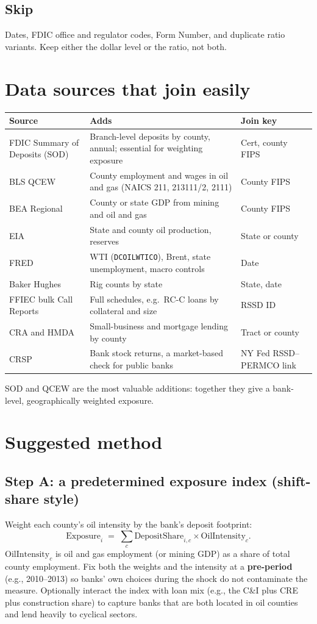 \documentclass[11pt]{article}
\begin{document}
\subsection*{Skip}
Dates, FDIC office and regulator codes, Form Number, and duplicate ratio variants. Keep either the dollar level or the ratio, not both.

\section{Data sources that join easily}

\begin{tabularx}{\textwidth}{@{}>{\raggedright\arraybackslash}p{4.2cm}Xp{2.8cm}@{}}
\toprule
\textbf{Source} & \textbf{Adds} & \textbf{Join key}\\
\midrule
FDIC Summary of Deposits (SOD) & Branch-level deposits by county, annual; essential for weighting exposure & Cert, county FIPS\\
BLS QCEW & County employment and wages in oil and gas (NAICS 211, 213111/2, 2111) & County FIPS\\
BEA Regional & County or state GDP from mining and oil and gas & County FIPS\\
EIA & State and county oil production, reserves & State or county\\
FRED & WTI (\texttt{DCOILWTICO}), Brent, state unemployment, macro controls & Date\\
Baker Hughes & Rig counts by state & State, date\\
FFIEC bulk Call Reports & Full schedules, e.g.\ RC-C loans by collateral and size & RSSD ID\\
CRA and HMDA & Small-business and mortgage lending by county & Tract or county\\
CRSP & Bank stock returns, a market-based check for public banks & NY Fed RSSD--PERMCO link\\
\bottomrule
\end{tabularx}

\medskip
SOD and QCEW are the most valuable additions: together they give a bank-level, geographically weighted exposure.

\section{Suggested method}

\subsection*{Step A: a predetermined exposure index (shift-share style)}
Weight each county's oil intensity by the bank's deposit footprint:
\[
  \text{Exposure}_i \;=\; \sum_c \text{DepositShare}_{i,c}\times \text{OilIntensity}_c .
\]
$\text{OilIntensity}_c$ is oil and gas employment (or mining GDP) as a share of total county employment. Fix both the weights and the intensity at a \textbf{pre-period} (e.g., 2010--2013) so banks' own choices during the shock do not contaminate the measure. Optionally interact the index with loan mix (e.g., the C\&I plus CRE plus construction share) to capture banks that are both located in oil counties and lend heavily to cyclical sectors.
\end{document}
